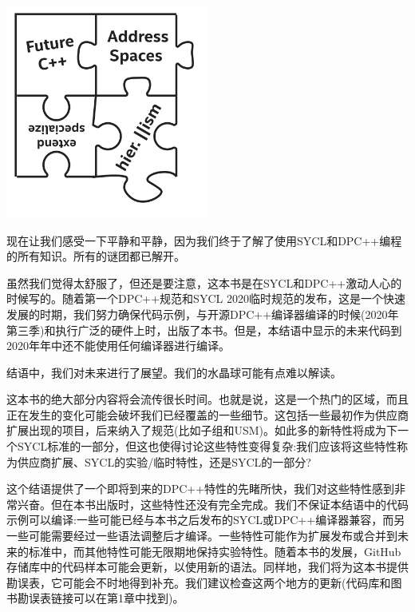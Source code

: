 \begin{center}
	\includegraphics[width=0.5\textwidth]{content/chapter-20/images/1}
\end{center}

现在让我们感受一下平静和平静，因为我们终于了解了使用SYCL和DPC++编程的所有知识。所有的谜团都已解开。\par

虽然我们觉得太舒服了，但还是要注意，这本书是在SYCL和DPC++激动人心的时候写的。随着第一个DPC++规范和SYCL 2020临时规范的发布，这是一个快速发展的时期，我们努力确保代码示例，与开源DPC++编译器编译的时候(2020年第三季)和执行广泛的硬件上时，出版了本书。但是，本结语中显示的未来代码到2020年年中还不能使用任何编译器进行编译。\par

结语中，我们对未来进行了展望。我们的水晶球可能有点难以解读。\par

这本书的绝大部分内容将会流传很长时间。也就是说，这是一个热门的区域，而且正在发生的变化可能会破坏我们已经覆盖的一些细节。这包括一些最初作为供应商扩展出现的项目，后来纳入了规范(比如子组和USM)。如此多的新特性将成为下一个SYCL标准的一部分，但这也使得讨论这些特性变得复杂:我们应该将这些特性称为供应商扩展、SYCL的实验/临时特性，还是SYCL的一部分?\par

这个结语提供了一个即将到来的DPC++特性的先睹所快，我们对这些特性感到非常兴奋。但在本书出版时，这些特性还没有完全完成。我们不保证本结语中的代码示例可以编译:一些可能已经与本书之后发布的SYCL或DPC++编译器兼容，而另一些可能需要经过一些语法调整后才编译。一些特性可能作为扩展发布或合并到未来的标准中，而其他特性可能无限期地保持实验特性。随着本书的发展，GitHub存储库中的代码样本可能会更新，以使用新的语法。同样地，我们将为这本书提供勘误表，它可能会不时地得到补充。我们建议检查这两个地方的更新(代码库和图书勘误表链接可以在第1章中找到)。\par
